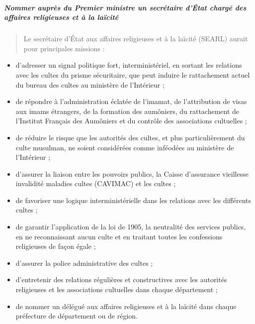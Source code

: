\hypertarget{nommer-aupruxe8s-du-premier-ministre-un-secruxe9taire-duxe9tat-charguxe9-des-affaires-religieuses-et-uxe0-la-lauxefcituxe9}{%
\subparagraph{Nommer auprès du Premier ministre un secrétaire d'État
chargé des affaires religieuses et à la
laïcité}\label{nommer-aupruxe8s-du-premier-ministre-un-secruxe9taire-duxe9tat-charguxe9-des-affaires-religieuses-et-uxe0-la-lauxefcituxe9}}

\begin{quote}
Le secrétaire d'État aux affaires religieuses et à la laïcité (SEARL)
aurait pour principales missions :
\end{quote}

\begin{itemize}
\item
  d'adresser un signal politique fort, interministériel, en sortant les
  relations avec les cultes du prisme sécuritaire, que peut induire le
  rattachement actuel du bureau des cultes au ministère de l'Intérieur ;
\item
  de répondre à l'administration éclatée de l'imamat, de l'attribution
  de visas aux imams étrangers, de la formation des aumôniers, du
  rattachement de l'Institut Français des Aumôniers et du contrôle des
  associations cultuelles ;
\item
  de réduire le risque que les autorités des cultes, et plus
  particulièrement du culte musulman, ne soient considérées comme
  inféodées au ministère de l'Intérieur ;
\item
  d'assurer la liaison entre les pouvoirs publics, la Caisse d'assurance
  vieillesse invalidité maladies cultes (CAVIMAC) et les cultes ;
\item
  de favoriser une logique interministérielle dans les relations avec
  les différents cultes ;
\item
  de garantir l'application de la loi de 1905, la neutralité des
  services publics, en ne reconnaissant aucun culte et en traitant
  toutes les confessions religieuses de façon égale ;
\item
  d'assurer la police administrative des cultes ;
\item
  d'entretenir des relations régulières et constructives avec les
  autorités religieuses et les associations cultuelles dans chaque
  département ;
\item
  de nommer un délégué aux affaires religieuses et à la laïcité dans
  chaque préfecture de département ou de région.
\end{itemize}

